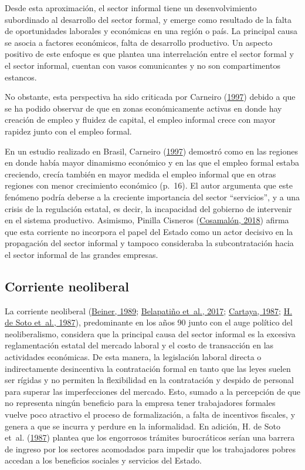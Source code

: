 \documentclass[
  letterpaper,
  12pt,
  oneside,
  spanish,
  doublespacing,
  headsepline,
  parskip]{MastersDoctoralThesis}
\begin{document}
Desde esta aproximación, el sector informal tiene un desenvolvimiento
subordinado al desarrollo del sector formal, y emerge como resultado de
la falta de oportunidades laborales y económicas en una región o país.
La principal causa se asocia a factores económicos, falta de desarrollo
productivo. Un aspecto positivo de este enfoque es que plantea una
interrelación entre el sector formal y el sector informal, cuentan con
vasos comunicantes y no son compartimentos estancos.

No obstante, esta perspectiva ha sido criticada por Carneiro
(\protect\hyperlink{ref-carneiro1997}{1997}) debido a que se ha podido
observar de que en zonas económicamente activas en donde hay creación de
empleo y fluidez de capital, el empleo informal crece con mayor rapidez
junto con el empleo formal.

En un estudio realizado en Brasil, Carneiro
(\protect\hyperlink{ref-carneiro1997}{1997}) demostró como en las
regiones en donde había mayor dinamismo económico y en las que el empleo
formal estaba creciendo, crecía también en mayor medida el empleo
informal que en otras regiones con menor crecimiento económico (p.~16).
El autor argumenta que este fenómeno podría deberse a la creciente
importancia del sector ``servicios'', y a una crisis de la regulación
estatal, es decir, la incapacidad del gobierno de intervenir en el
sistema productivo. Asimismo, Pinilla Cisneros
(\protect\hyperlink{ref-cosamaluxf3n2018}{Cosamalón, 2018}) afirma que
esta corriente no incorpora el papel del Estado como un actor decisivo
en la propagación del sector informal y tampoco consideraba la
subcontratación hacia el sector informal de las grandes empresas.

\hypertarget{corriente-neoliberal}{%
\subsection{Corriente neoliberal}\label{corriente-neoliberal}}

La corriente neoliberal (\protect\hyperlink{ref-beiner1989}{Beiner,
1989}; \protect\hyperlink{ref-belapatiuxf1o2017}{Belapatiño et~al.,
2017}; \protect\hyperlink{ref-cartaya1987}{Cartaya, 1987};
\protect\hyperlink{ref-desoto1987}{H. de Soto et~al., 1987}),
predominante en los años 90 junto con el auge político del
neoliberalismo, considera que la principal causa del sector informal es
la excesiva reglamentación estatal del mercado laboral y el costo de
transacción en las actividades económicas. De esta manera, la
legislación laboral directa o indirectamente desincentiva la
contratación formal en tanto que las leyes suelen ser rígidas y no
permiten la flexibilidad en la contratación y despido de personal para
superar las imperfecciones del mercado. Esto, sumado a la percepción de
que no representa ningún beneficio para la empresa tener trabajadores
formales vuelve poco atractivo el proceso de formalización, a falta de
incentivos fiscales, y genera a que se incurra y perdure en la
informalidad. En adición, H. de Soto et~al.
(\protect\hyperlink{ref-desoto1987}{1987}) plantea que los engorrosos
trámites burocráticos serían una barrera de ingreso por los sectores
acomodados para impedir que los trabajadores pobres accedan a los
beneficios sociales y servicios del Estado.
\end{document}
